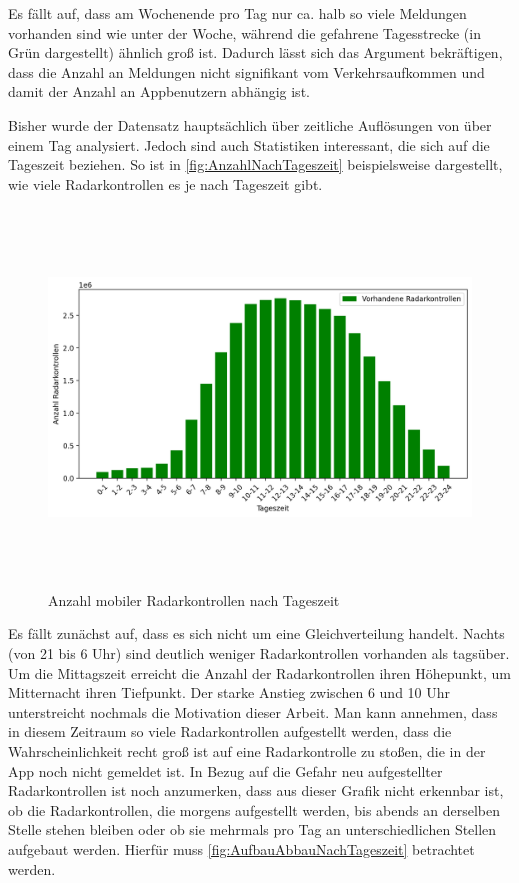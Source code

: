 Es fällt auf, dass am Wochenende pro Tag nur ca. halb so viele Meldungen vorhanden sind wie unter der Woche, während die gefahrene Tagesstrecke \cite[Tabelle 3]{MiD} (in Grün dargestellt) ähnlich groß ist.
Dadurch lässt sich das Argument bekräftigen, dass die Anzahl an Meldungen nicht signifikant vom Verkehrsaufkommen und damit der Anzahl an Appbenutzern abhängig ist.

Bisher wurde der Datensatz hauptsächlich über zeitliche Auflösungen von über einem Tag analysiert.
Jedoch sind auch Statistiken interessant, die sich auf die Tageszeit beziehen.
So ist in \autoref{fig:AnzahlNachTageszeit} beispielsweise dargestellt, wie viele Radarkontrollen es je nach Tageszeit gibt.

\begin{figure}[h]
    \centering
    \includegraphics[width=1.0\textwidth,height=10cm,keepaspectratio=true]{content/images/AnzahlNachTageszeit.png}
    \caption{Anzahl mobiler Radarkontrollen nach Tageszeit}
    \label{fig:AnzahlNachTageszeit}
\end{figure}

Es fällt zunächst auf, dass es sich nicht um eine Gleichverteilung handelt.
Nachts (von 21 bis 6 Uhr) sind deutlich weniger Radarkontrollen vorhanden als tagsüber.
Um die Mittagszeit erreicht die Anzahl der Radarkontrollen ihren Höhepunkt, um Mitternacht ihren Tiefpunkt.
Der starke Anstieg zwischen 6 und 10 Uhr unterstreicht nochmals die Motivation dieser Arbeit.
Man kann annehmen, dass in diesem Zeitraum so viele Radarkontrollen aufgestellt werden,
dass die Wahrscheinlichkeit recht groß ist auf eine Radarkontrolle zu stoßen, die in der App noch nicht gemeldet ist.
In Bezug auf die Gefahr neu aufgestellter Radarkontrollen ist noch anzumerken, dass aus dieser Grafik nicht erkennbar ist, ob die Radarkontrollen, die morgens aufgestellt werden, bis abends an derselben Stelle stehen bleiben oder ob sie mehrmals pro Tag an unterschiedlichen Stellen aufgebaut werden.
Hierfür muss \autoref{fig:AufbauAbbauNachTageszeit} betrachtet werden.


